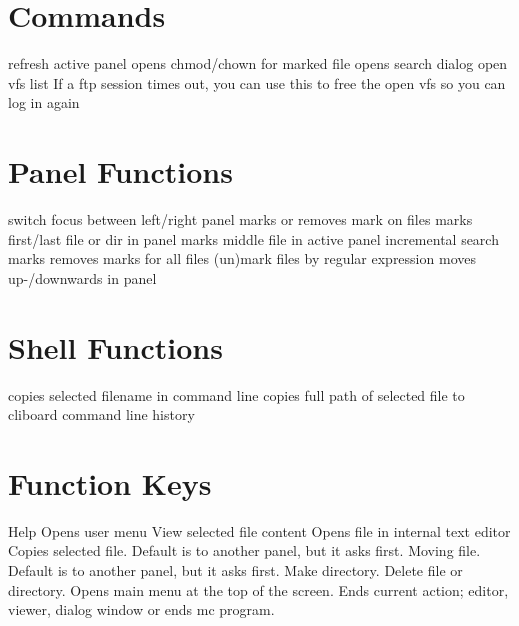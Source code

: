 
\def\content{\uppercase{MC}}
\def\shortcontent{\content}
\def\versionnumber{1.2}  %
\def\version{v\versionnumber\ \month\ \year}


\mytitle

\shortintro

\section{Commands}{}
	{refresh active panel}
	{opens chmod/chown for marked file}
	{opens search dialog}
	{open vfs list}
\cmdExmpl{}	{If a ftp session times out, you can use this to free the open vfs so you can log in again}


\section{Panel Functions}{}
\cmdS{\tab}	{switch focus between left/right panel}
	{marks or removes mark on files}
	{marks first/last file or dir in panel}
	{marks middle file in active panel}
	{incremental search}
\cmdS{$\ast$}	{marks \or removes marks for all files}
\cmdS{+~\bs}	{(un)mark files by regular expression}
	{moves up-/downwards in panel}


\section{Shell Functions}{}

\cmdS{\alt \enter}	{copies selected filename in command line}
\cmdS{\ctrl \shift \enter}	{copies full path of selected file to cliboard}
	{command line history}


\section{Function Keys}{}
	{Help}
	{Opens user menu}
	{View selected file content}
	{Opens file in internal text editor}
	{Copies selected file. Default is to another panel, but it asks first.}
	{Moving file. Default is to another panel, but it asks first.}
	{Make directory.}
	{Delete file or directory.}
	{Opens main menu at the top of the screen.}
	{Ends current action; editor, viewer, dialog window or ends mc program.}

